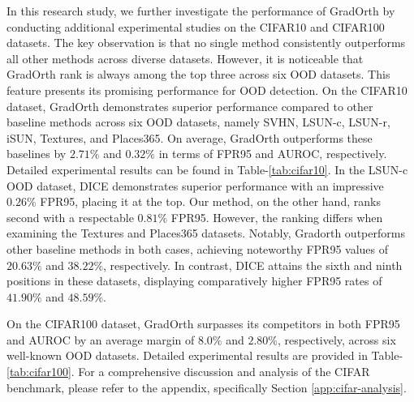 \documentclass{article}
\begin{document}
In this research study, we further investigate the performance of GradOrth by conducting additional experimental studies on the CIFAR10 and CIFAR100 datasets. The key observation is that no single method consistently outperforms all other methods across diverse datasets. However, it is noticeable that GradOrth rank is always among the top three across six OOD datasets. This feature presents its promising performance for OOD detection. On the CIFAR10 dataset, GradOrth demonstrates superior performance compared to other baseline methods across six OOD datasets, namely SVHN, LSUN-c, LSUN-r, iSUN, Textures, and Places365. On average, GradOrth outperforms these baselines by $2.71\%$ and $0.32\%$ in terms of FPR95 and AUROC, respectively. Detailed experimental results can be found in Table-\ref{tab:cifar10}. In the LSUN-c OOD dataset, DICE demonstrates superior performance with an impressive $0.26\%$ FPR95, placing it at the top. Our method, on the other hand, ranks second with a respectable $0.81\%$ FPR95. However, the ranking differs when examining the Textures and Places365 datasets. Notably, Gradorth outperforms other baseline methods in both cases, achieving noteworthy FPR95 values of $20.63\%$ and $38.22\%$, respectively. In contrast, DICE attains the sixth and ninth positions in these datasets, displaying comparatively higher FPR95 rates of $41.90\%$ and $48.59\%$.

On the CIFAR100 dataset, GradOrth surpasses its competitors in both FPR95 and AUROC by an average margin of $8.0\%$ and $2.80\%$, respectively, across six well-known OOD datasets. Detailed experimental results are provided in Table-\ref{tab:cifar100}. For a comprehensive discussion and analysis of the CIFAR benchmark, please refer to the appendix, specifically Section \ref{app:cifar-analysis}.
\end{document}
